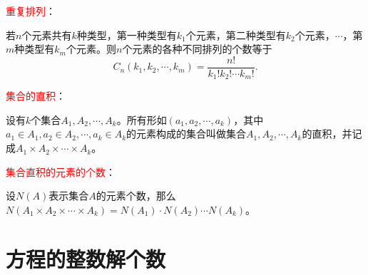 \documentclass[12pt,a4paper]{article}
\begin{document}
\textcolor{red}{重复排列}：

若$n$个元素共有$k$种类型，第一种类型有$k_1$个元素，第二种类型有$k_2$个元素，$\cdots$，第$m$种类型有$k_m$个元素。则$n$个元素的各种不同排列的个数等于
\begin{equation}
C_n(k_1, k_2, \cdots, k_m) = \frac{n!}{k_1!k_2!\cdots k_m!} .
\end{equation}

\textcolor{red}{集合的直积}：

设有$k$个集合$A_1, A_2, \cdots, A_k$。所有形如$(a_1, a_2, \cdots, a_k)$，其中$a_1 \in A_1, a_2 \in A_2, \cdots, a_k \in A_k$的元素构成的集合叫做集合$A_1, A_2, \cdots, A_k$的直积，并记成$A_1\times A_2\times \cdots \times A_k$。

\textcolor{red}{集合直积的元素的个数}：

设$N(A)$表示集合$A$的元素个数，那么$N(A_1\times A_2\times \cdots \times A_k) = N(A_1)\cdot N(A_2) \cdots N(A_k)$。

\section{方程的整数解个数}



























































\end{document}
